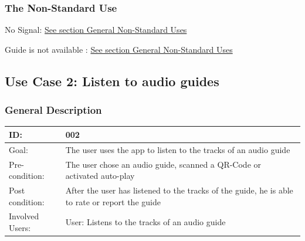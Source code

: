 \documentclass[12pt]{article}
\theoremstyle{definition}
\newenvironment{text}{
   \setlength{\parindent}{0pt}
   \color{black}
}{}
\begin{document}
    \subsubsection{The Non-Standard Use}
    \begin{text}

    No Signal: \hyperref[sec:gnsu]{See section General Non-Standard Uses }
    
    Guide is not available : \hyperref[sec:gnsu]{See section General Non-Standard Uses }
    \end{text}
    
\pagebreak

\subsection{Use Case 2: Listen to audio guides}
    \subsubsection{General Description}
    
    \begin{tabular}{|p{.2\linewidth}|p{.65\linewidth}|}
        \hline 
        ID: & 002 \\ \hline
        Goal: & The user uses the app to listen to the tracks of an audio guide \\ \hline
        Pre-condition: & The user chose an audio guide, scanned a QR-Code or activated auto-play \\ \hline
        Post condition: & After the user has listened to the tracks of the guide, he is able to rate or report the guide \\ \hline
        Involved Users: & User: Listens to the tracks of an audio guide \\ \hline
    \end{tabular}
    
\end{document}
